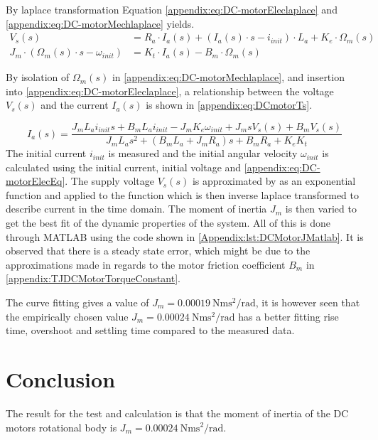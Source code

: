 By laplace transformation Equation \ref{appendix:eq:DC-motorEleclaplace} and \ref{appendix:eq:DC-motorMechlaplace} yields.
\begin{subequations}
\begin{align}
V_{s}(s) &= R_{a}\cdot I_a(s) + \left(I_a(s)\cdot s-i_{init}\right) \cdot L_a + K_{e}\cdot\Omega_{m}(s)\label{appendix:eq:DC-motorEleclaplace}\\
J_m \cdot\left( \Omega_m(s)\cdot s - \omega_{init} \right) &= K_t\cdot I_a(s) - B_m \cdot \Omega_{m}(s)\label{appendix:eq:DC-motorMechlaplace}
\end{align}
\end{subequations}

By isolation of $\Omega_m(s)$ in \autoref{appendix:eq:DC-motorMechlaplace}, and insertion into \autoref{appendix:eq:DC-motorEleclaplace}, a relationship between the voltage $V_s(s)$ and the current $I_a(s)$ is shown in \autoref{appendix:eq:DCmotorTs}.

\begin{equation}
I_a(s) = \frac{J_mL_ai_{init}s+B_mL_ai_{init}-J_mK_e\omega_{init}+J_msV_s(s)+B_mV_s(s)}{J_mL_as^2+(B_mL_a+J_mR_a)s+B_mR_a+K_eK_t}\label{appendix:eq:DCmotorTs}
\end{equation}
The initial current $i_{init}$ is measured and the initial angular velocity $\omega_{init}$ is calculated using the initial current, initial voltage and \autoref{appendix:eq:DC-motorElecEq}.
The supply voltage $V_s(s)$ is approximated by as an exponential function and applied to the function which is then inverse laplace transformed to describe current in the time domain.
The moment of inertia $J_m$ is then varied to get the best fit of the dynamic properties of the system. All of this is done through MATLAB using the code shown in \autoref{Appendix:lst:DCMotorJMatlab}.
It is observed that there is a steady state error, which might be due to the approximations made in regards to the motor friction coefficient $B_m$ in \autoref{appendix:TJDCMotorTorqueConstant}.


The curve fitting gives a value of $J_m = \SI{0.00019}{\newton\metre\second\squared\per\radian}$, it is however seen that the empirically chosen value $J_m = \SI{0.00024}{\newton\metre\second\squared\per\radian}$ has a better fitting rise time, overshoot and settling time compared to the measured data.

\section*{Conclusion}
The result for the test and calculation is that the moment of inertia of the DC motors rotational body is $J_m = \SI{0.00024}{\newton\metre\second\squared\per\radian}$.